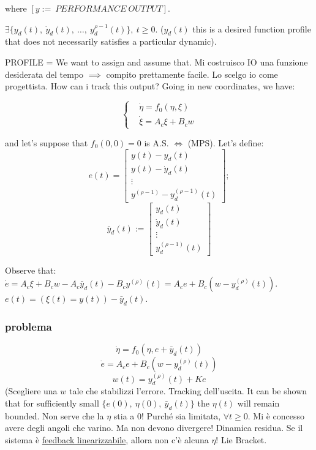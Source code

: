 where $[y :=\ PERFORMANCE\ OUTPUT]$.

$\exists \{y_d(t),\ \dot{y}_d(t),\ \dots,\ y^{\rho-1}_d(t)\},\ t \geq 0$. ($y_d(t)$ this is a desired function profile that does not necessarily satisfies a particular dynamic).

PROFILE = We want to assign and assume that. Mi costruisco IO una funzione desiderata del tempo $\implies$ compito prettamente facile. Lo scelgo io come progettista. How can i track this output? Going in new coordinates, we have:

\[
	\left\{
	\begin{aligned}
	&\dot{\eta} = f_0(\eta, \xi) \\
	&\dot{\xi} = A_c\xi + B_cw
	\end{aligned}
	\right.
\]

and let's suppose that $f_0(0,0) = 0$ is A.S. $\iff$ (MPS). Let's define:
\[
	e(t) = \begin{bmatrix}y(t) - y_d(t)\\ y(t) - \dot{y}_d(t) \\ \vdots \\ y^{(\rho-1)} - y^{(\rho-1)}_d(t)\end{bmatrix};
\]
\[
	\bar{y}_d(t) := \begin{bmatrix}y_d(t)\\ \dot{y}_d(t)\\ \vdots \\ y^{(\rho-1)}_d(t)\end{bmatrix}
\]

Observe that: $\dot{e} = A_c\xi + B_cw - A_c\bar{y}_d(t) - B_cy^{(\rho)}(t) = A_ce + B_c(w - y^{(\rho)}_d(t))$. $e(t) = (\xi(t) = y(t)) - \bar{y}_d(t)$.

\subsubsection{problema}

\[
	\dot{\eta} = f_0(\eta, e+\bar{y}_d(t))
\]
\[
	\dot{e} = A_ce + B_c(w - y^{(\rho)}_d(t))
\]
\[
	w(t) = y^{(\rho)}_d(t) + Ke
\]
(Scegliere una $w$ tale che stabilizzi l'errore. Tracking dell'uscita. It can be shown that for sufficiently small $\{e(0),\ \eta(0),\ \bar{y}_d(t)\}$ the $\eta(t)$ will remain bounded. Non serve che la $\eta$ stia a 0! Purché sia limitata, $\forall t \geq 0$.
Mi è concesso avere degli angoli che varino. Ma non devono divergere! Dinamica residua. Se il sistema è \underline{feedback linearizzabile}, allora non c'è alcuna $\eta$! Lie Bracket.

